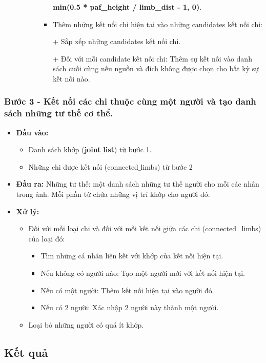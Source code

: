\begin{itemize}
\begin{itemize}
\begin{itemize}
\begin{itemize}
			\textbf{min(0.5 * paf\_height / limb\_dist - 1, 0)}.
			\item Thêm những kết nối chi hiện tại vào những candidates kết nối chi:
			
			+ Sắp xếp những candidates kết nối chi.
			
			+ Đối với mỗi candidate kết nối chi: Thêm sự kết nối vào danh sách cuối cùng nếu nguồn và đích không được chọn cho bất kỳ sự kết nối nào.
			\end{itemize}
		\end{itemize}
	\end{itemize}
\end{itemize}

\subsubsection{Bước 3 - Kết nối các chi thuộc cùng một người và tạo danh sách những tư thế cơ thể.}
\begin{itemize}
\item \textbf{Đầu vào:}
	\begin{itemize}
	\item Danh sách khớp (\textbf{joint$\_$list}) từ bước 1.
	\item Những chi được kết nối (connected$\_$limbs) từ bước 2
	\end{itemize}
\item \textbf{Đầu ra:} Những tư thế: một danh sách những tư thế người cho mỗi các nhân trong ảnh. Mỗi phần từ chứa những vị trí khớp cho người đó.
\item \textbf{Xử lý:}
	\begin{itemize}
	\item Đối với mỗi loại chi và đối với mỗi kết nối giữa các chi (connected\_limbs) của loại đó:
		\begin{itemize}
		\item Tìm những cá nhân liên kết với khớp của kết nối hiện tại.
		\item Nếu không có người nào: Tạo một người mới với kết nối hiện tại.
		\item Nếu có một người: Thêm kết nối hiện tại vào người đó.
		\item Nếu có 2 người: Xác nhập 2 người này thành một người.
		\end{itemize}
	\item Loại bỏ những người có quá ít khớp.
	\end{itemize}
\end{itemize}

\subsection{Kết quả}
